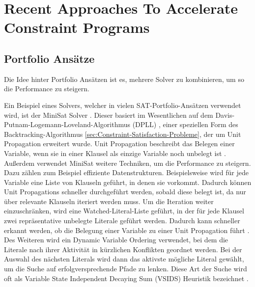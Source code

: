 \section{Recent Approaches To Accelerate Constraint Programs}
\label{sec:Recent-Approaches-To-Accelerate-Constraint-Programs}


\subsection{Portfolio Ansätze}
\label{sec:Portfolio-Ansätze}

Die Idee hinter Portfolio Ansätzen ist es, mehrere Solver zu kombinieren, um so
die Performance zu steigern. 


Ein Beispiel eines Solvers, welcher in vielen SAT-Portfolio-Ansätzen verwendet
wird, ist der MiniSat Solver \cite{een04bo}. Dieser basiert im Wesentlichen auf
dem Davis-Putnam-Logemann-Loveland-Algorithmus (DPLL) \cite{davis62jo}, einer
speziellen Form des Backtracking-Algorithmus
\ref{sec:Constraint-Satisfaction-Probleme}, der um Unit Propagation erweitert
wurde. Unit Propagation beschreibt das Belegen einer Variable, wenn sie in einer
Klausel als einzige Variable noch unbelegt ist \cite*[S.89]{rossi06bo}. Außerdem
verwendet MiniSat weitere Techniken, um die Performance zu steigern. Dazu zählen
zum Beispiel effiziente Datenstrukturen. Beispielsweise wird für jede Variable
eine Liste von Klauseln geführt, in denen sie vorkommt. Dadurch können Unit
Propagations schneller durchgeführt werden, sobald diese belegt ist, da nur über
relevante Klauseln iteriert werden muss. Um die Iteration weiter einzuschränken,
wird eine Watched-Literal-Liste geführt, in der für jede Klausel zwei
repräsentative unbelegte Literale geführt werden. Dadurch kann schneller erkannt
werden, ob die Belegung einer Variable zu einer Unit Propagation führt
\cite[505]{een04bo}. Des Weiteren wird ein Dynamic Variable Ordering verwendet,
bei dem die Literale nach ihrer Aktivität in kürzlichen Konflikten geordnet
werden. Bei der Auswahl des nächsten Literals wird dann das aktivste mögliche
Literal gewählt, um die Suche auf erfolgversprechende Pfade zu lenken. Diese Art
der Suche wird oft als Variable State Independent Decaying Sum (VSIDS) Heuristik
bezeichnet \cite[506f]{een04bo}.



